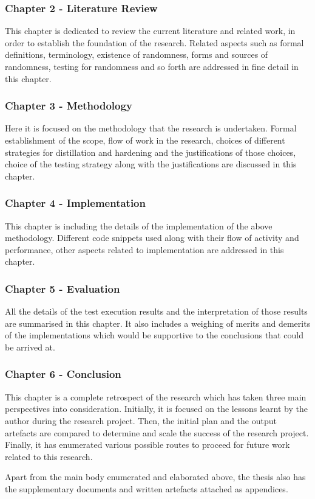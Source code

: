 \begin{sectionlist}
    \subsubsection{Chapter 2 - Literature Review}
    This chapter is dedicated to review the current literature and related work, in order to establish the foundation of the research. Related aspects such as formal definitions, terminology, existence of randomness, forms and sources of randomness, testing for randomness and so forth are addressed in fine detail in this chapter. 
	
    \subsubsection{Chapter 3 - Methodology}
    Here it is focused on the methodology that the research is undertaken. Formal establishment of the scope, flow of work in the research, choices of different strategies for distillation and hardening and the justifications of those choices, choice of the testing strategy along with the justifications are discussed in this chapter.
	
    \subsubsection{Chapter 4 - Implementation}
    This chapter is including the details of the implementation of the above methodology. Different code snippets used along with their flow of activity and performance, other aspects related to implementation are addressed in this chapter.
	
    \subsubsection{Chapter 5 - Evaluation}
    All the details of the test execution results and the interpretation of those results are summarised in this chapter. It also includes a weighing of merits and demerits of the implementations which would be supportive to the conclusions that could be arrived at.
	
    \subsubsection{Chapter 6 - Conclusion}
    This chapter is a complete retrospect of the research which has taken three main perspectives into consideration. Initially, it is focused on the lessons learnt by the author during the research project. Then, the initial plan and the output artefacts are compared to determine and scale the success of the research project. Finally, it has enumerated various possible routes to proceed for future work related to this research.
\end{sectionlist}

Apart from the main body enumerated and elaborated above, the thesis also has the supplementary documents and written artefacts attached as appendices.